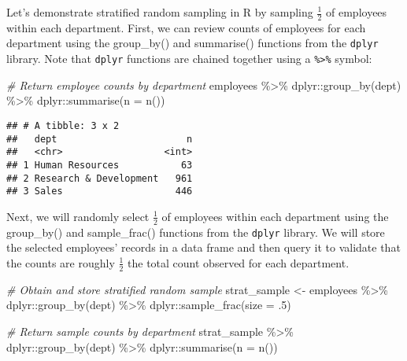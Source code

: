 \documentclass[
]{book}
\newenvironment{Shaded}{\begin{snugshade}}{\end{snugshade}}
\newcommand{\AttributeTok}[1]{\textcolor[rgb]{0.77,0.63,0.00}{#1}}
\newcommand{\CommentTok}[1]{\textcolor[rgb]{0.56,0.35,0.01}{\textit{#1}}}
\newcommand{\DecValTok}[1]{\textcolor[rgb]{0.00,0.00,0.81}{#1}}
\newcommand{\FunctionTok}[1]{\textcolor[rgb]{0.00,0.00,0.00}{#1}}
\newcommand{\NormalTok}[1]{#1}
\newcommand{\OtherTok}[1]{\textcolor[rgb]{0.56,0.35,0.01}{#1}}
\newcommand{\SpecialCharTok}[1]{\textcolor[rgb]{0.00,0.00,0.00}{#1}}
\begin{document}
Let's demonstrate stratified random sampling in R by sampling \(\frac{1}{2}\) of employees within each department. First, we can review counts of employees for each department using the group\_by() and summarise() functions from the \texttt{dplyr} library. Note that \texttt{dplyr} functions are chained together using a \texttt{\%\textgreater{}\%} symbol:

\begin{Shaded}
\begin{Highlighting}[]
\CommentTok{\# Return employee counts by department}
\NormalTok{employees }\SpecialCharTok{\%\textgreater{}\%}
\NormalTok{dplyr}\SpecialCharTok{::}\FunctionTok{group\_by}\NormalTok{(dept) }\SpecialCharTok{\%\textgreater{}\%}
\NormalTok{dplyr}\SpecialCharTok{::}\FunctionTok{summarise}\NormalTok{(}\AttributeTok{n =} \FunctionTok{n}\NormalTok{())}
\end{Highlighting}
\end{Shaded}

\begin{verbatim}
## # A tibble: 3 x 2
##   dept                       n
##   <chr>                  <int>
## 1 Human Resources           63
## 2 Research & Development   961
## 3 Sales                    446
\end{verbatim}

Next, we will randomly select \(\frac{1}{2}\) of employees within each department using the group\_by() and sample\_frac() functions from the \texttt{dplyr} library. We will store the selected employees' records in a data frame and then query it to validate that the counts are roughly \(\frac{1}{2}\) the total count observed for each department.

\begin{Shaded}
\begin{Highlighting}[]
\CommentTok{\# Obtain and store stratified random sample}
\NormalTok{strat\_sample }\OtherTok{\textless{}{-}}\NormalTok{ employees }\SpecialCharTok{\%\textgreater{}\%}
\NormalTok{                dplyr}\SpecialCharTok{::}\FunctionTok{group\_by}\NormalTok{(dept) }\SpecialCharTok{\%\textgreater{}\%}
\NormalTok{                dplyr}\SpecialCharTok{::}\FunctionTok{sample\_frac}\NormalTok{(}\AttributeTok{size =}\NormalTok{ .}\DecValTok{5}\NormalTok{)}

\CommentTok{\# Return sample counts by department}
\NormalTok{strat\_sample }\SpecialCharTok{\%\textgreater{}\%}
\NormalTok{dplyr}\SpecialCharTok{::}\FunctionTok{group\_by}\NormalTok{(dept) }\SpecialCharTok{\%\textgreater{}\%}
\NormalTok{dplyr}\SpecialCharTok{::}\FunctionTok{summarise}\NormalTok{(}\AttributeTok{n =} \FunctionTok{n}\NormalTok{())}
\end{Highlighting}
\end{Shaded}
\end{document}

